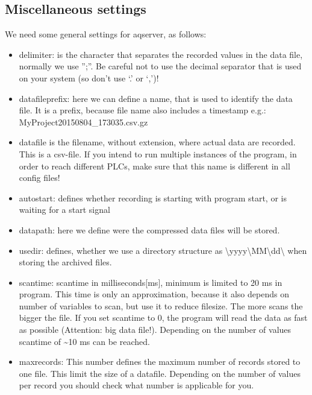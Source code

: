 \documentclass[a4paper,10pt,english]{sphinxmanual}
\begin{document}
\subsection{Miscellaneous settings}
\label{configuration:miscellaneous-settings}
We need some general settings for aqserver, as follows:
\begin{itemize}
\item {} 
delimiter: is the character that separates the recorded values in the data file, normally we use '';''. Be careful not to use the decimal separator that is used on your system (so don't use `.' or `,')!

\item {} 
datafileprefix: here we can define a name, that is used to identify the data file. It is a prefix, because file name also includes a timestamp e.g.: MyProject20150804\_173035.csv.gz

\item {} 
datafile is the filename, without extension, where actual data are recorded. This is a csv-file. If you intend to run multiple instances of the program, in order to reach different PLCs, make sure that this name is different in all config files!

\item {} 
autostart: defines whether recording is starting with program start, or is waiting for a start signal

\item {} 
datapath: here we define were the compressed data files will be stored.

\item {} 
usedir: defines, whether we use a directory structure as \textbackslash{}yyyy\textbackslash{}MM\textbackslash{}dd\textbackslash{} when storing the archived files.

\item {} 
scantime: scantime in milliseconds{[}ms{]}, minimum is limited to 20 ms in program. This time is only an approximation, because it also depends on number of variables to scan, but use it to reduce filesize. The more scans the bigger the file. If you set scantime to 0, the program will read the data as fast as possible (Attention: big data file!). Depending on the number of values scantime of \textasciitilde{}10 ms can be reached.

\item {} 
maxrecords: This number defines the maximum number of records stored to one file. This limit the size of a datafile. Depending on the number of values per record you should check what number is applicable for you.

\end{itemize}
\end{document}
